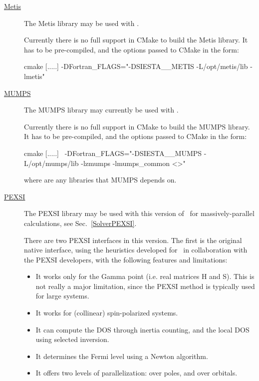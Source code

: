 \begin{description}
  \item[\href{http://glaros.dtc.umn.edu/gkhome/metis/metis/overview}{Metis}]%
  The Metis library may be used with \tsiesta.

  Currently there is no full support in CMake to build the Metis
  library. It has to be pre-compiled, and the options passed to CMake
  in the form:

  \begin{shellexample}
    cmake [.....] -DFortran_FLAGS="-DSIESTA__METIS -L/opt/metis/lib -lmetis"
  \end{shellexample}

  \item[\href{http://mumps.enseeiht.fr}{MUMPS}]%
  The MUMPS library may currently be used with \tsiesta.

  Currently there is no full support in CMake to build the MUMPS
  library. It has to be pre-compiled, and the options passed to CMake
  in the form:

  \begin{shellexample}
    cmake [.....] \
    -DFortran_FLAGS="-DSIESTA__MUMPS -L/opt/mumps/lib -lzmumps -lmumps_common <>"
  \end{shellexample}
  where \shell{<>} are any libraries that MUMPS depends on.


  \item[\href{http://pexsi.org}{PEXSI}]%
  The PEXSI library may be used with this version of \siesta\ for massively-parallel
  calculations, see Sec.~\ref{SolverPEXSI}.

  There are two PEXSI interfaces in this version. The first is the original native interface, using the heuristics
  developed for \siesta\ in collaboration with the PEXSI developers, with the following
  features and limitations:
  \begin{itemize}
    \item It works only for the Gamma point (i.e. real matrices H and S). This is not
      really a major limitation, since the PEXSI method is typically used for large systems.
    \item It works for (collinear) spin-polarized systems.
    \item It can compute the DOS through inertia counting, and the local DOS using selected inversion.
    \item It determines the Fermi level using a Newton algorithm.
    \item It offers two levels of parallelization: over poles, and over orbitals.
  \end{itemize}


\end{description}
